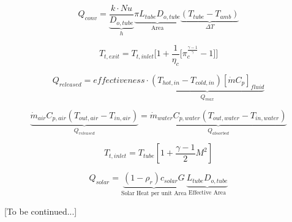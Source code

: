 \documentclass[heading.tex]{subfiles}
\begin{document}
\begin{equation}
Q_{conv} = \underbrace{ \frac{k\cdot Nu}{ {D}_{o,tube}} }_\text{$h$}
 \underbrace{ \pi {L}_{tube} {D}_{o,tube} }_\text{Area}
 \underbrace{ (T_{tube}-T_{amb})  }_\text{$\Delta T$}
\end{equation}

\begin{equation}
T_{t,exit} = T_{t,inlet} \Bigg[ 1 + \frac{1}{\eta_{c}} \Big[ \pi_{c}^{\frac{\gamma-1}{\gamma}}- 1 \Big] \Bigg]
\end{equation}

\begin{equation}
{Q}_{released}  = effectiveness \cdot \underbrace{\left(T_{hot,in} - T_{cold,in}\right) [ \dot{m} C_{p} ]_{fluid}}_\text{${Q}_{max}$}
\end{equation}

\begin{equation}
\underbrace{\dot{m}_{air} C_{p, air} (T_{out, air} - T_{in, air})}_{{Q}_{released}}  = \underbrace{\dot{m}_{water} C_{p,water} (T_{out, water} - T_{in, water})}_{{Q}_{absorbed}}
\end{equation}

\begin{equation}
T_{t,inlet} = T_{tube} [1 + \frac{\gamma -1}{2} M^2]
\end{equation}

\begin{equation}
Q_{solar} = \underbrace{ (1- \rho_{r})  c_{solar}G}_\text{Solar Heat per unit Area} \underbrace{L_{tube}  D_{o,tube}}_\text{Effective Area}
\end{equation}

[To be continued...]
\end{document}
